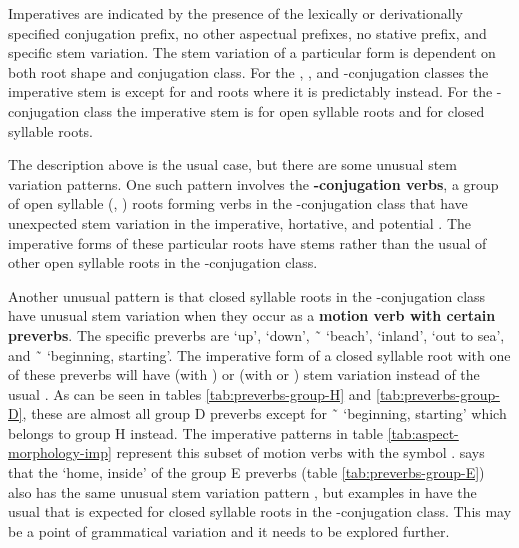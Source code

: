 \begin{multicols}{2}
\noindent
Imperatives are indicated by the presence of the lexically or derivationally specified conjugation prefix, no other aspectual prefixes, no stative prefix, and specific stem variation.
The stem variation of a particular form is dependent on both root shape and conjugation class.
For the , , and -conjugation classes the imperative stem is  except for  and  roots where it is predictably  instead.
For the -conjugation class the imperative stem is  for open syllable roots and  for closed syllable roots.

The description above is the usual case, but there are some unusual stem variation patterns.
One such pattern involves the \textbf{-conjugation verbs}, a group of open syllable (, ) roots forming verbs in the -conjugation class that have unexpected stem variation in the imperative, hortative, and potential \parencites[204, 269–270]{leer:1991}[84–86]{eggleston:2013a}[155–156, 160, 163–164]{crippen:2019}.
The imperative forms of these particular roots have  stems rather than the usual  of other open syllable roots in the -conjugation class.

Another unusual pattern is that closed syllable roots in the -conjugation class have unusual stem variation when they occur as a \textbf{motion verb with certain preverbs}.
The specific preverbs are  ‘up’,  ‘down’,  \~\  ‘beach’,  ‘inland’,  ‘out to sea’, and  \~\  ‘beginning, starting’.
The imperative form of a closed syllable root with one of these preverbs will have  (with ) or  (with  or ) stem variation instead of the usual  \parencites[176]{story:1966}[209]{leer:1991}[86–87]{eggleston:2013a}[154–155]{crippen:2019}.
As can be seen in tables \ref{tab:preverbs-group-H} and \ref{tab:preverbs-group-D}, these are almost all group D preverbs except for  \~\  ‘beginning, starting’ which belongs to group H instead.
The imperative patterns in table \ref{tab:aspect-morphology-imp} represent this subset of motion verbs with the symbol .
\citeauthor{story:1966} says that the  ‘home, inside’ of the group E preverbs (table \ref{tab:preverbs-group-E}) also has the same unusual stem variation pattern \parencite[176]{story:1966}, but examples in \cite{eggleston:2017} have the usual  that is expected for closed syllable roots in the -conjugation class.
This may be a point of grammatical variation and it needs to be explored further.


\end{multicols}
